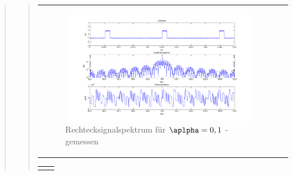 \begin{quote}
\begin{quote}
\begin{center}
\begin{tabular}{ll}
\begin{minipage}{0.6\textwidth}
                    \begin{figure}[H]
                        \label{fig:}
                        \includegraphics[scale=0.3]{./Bilder/recht_alpha1_-_gemessen.png} %
                        \caption{Rechtecksignalspektrum für $\aplpha = 0,1$ - gemessen}
                    \end{figure}
                \vspace{-1.5em}

                \end{minipage}

            \end{tabular}
            \end{center}

            \begin{center}
            \begin{tabular}{ll}

            \hspace{-12em}
                \begin{minipage}{0.6\textwidth}


\end{minipage}
\end{tabular}
\end{center}
\end{quote}
\end{quote}
